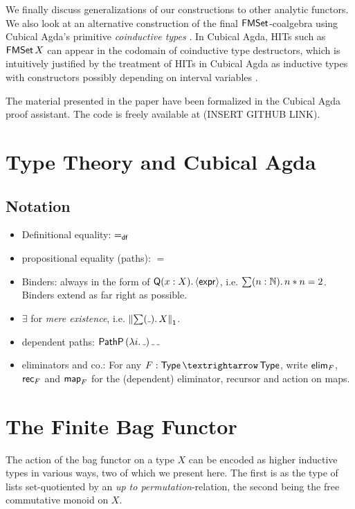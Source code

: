 \documentclass[runningheads]{llncs}
\begin{document}
We finally discuss generalizations of our constructions to other analytic functors. We also look at an alternative construction of the final $\operatorname{\mathsf{FMSet}}$-coalgebra using Cubical Agda's primitive \emph{coinductive types} \cite{Vezzosi2019}. In Cubical Agda, HITs such as $\operatorname{\mathsf{FMSet}} X$ can appear in the codomain of coinductive type destructors, which is intuitively justified by the treatment of HITs in Cubical Agda as inductive types with constructors possibly depending on interval variables \cite{Coquand2018,Cavallo2019}.

The material presented in the paper have been formalized in the Cubical Agda proof
assistant. The code is freely available at (INSERT GITHUB LINK).

\section{Type Theory and Cubical Agda}

\subsection{Notation}
\begin{itemize}
  \item Definitional equality: $\mathbin{=_\mathsf{df}}$
  \item propositional equality (paths): $=$
  \item Binders: always in the form of $\mathsf{Q} (x : X)\mathpunct{.} \langle\mathsf{expr}\rangle$,
    i.e. $\sum (n : \mathbb{N})\mathpunct{.} n * n = 2$.
    Binders extend as far right as possible.
  \item $\exists$ for \emph{mere existence}, i.e. $\PropTrunc{\sum (\mathunderscore)\Where X}$.
  \item dependent paths: $\PathP{} (\lambda i\Where \mathunderscore)\, \mathunderscore\, \mathunderscore$
  \item eliminators and co.:
    For any $F : \Type → \Type$, write
    $\operatorname{\mathsf{elim}}_{F}$, $\operatorname{\mathsf{rec}}_{F}$ and $\operatorname{\mathsf{map}}_{F}$
    for the (dependent) eliminator, recursor and action on maps.
\end{itemize}


\section{The Finite Bag Functor}

The action of the bag functor on a type $X$ can be encoded as higher inductive
types in various ways, two of which we present here.
The first is as the type of lists set-quotiented by an \emph{up to permutation}-relation,
the second being the free commutative monoid on $X$.
\end{document}
